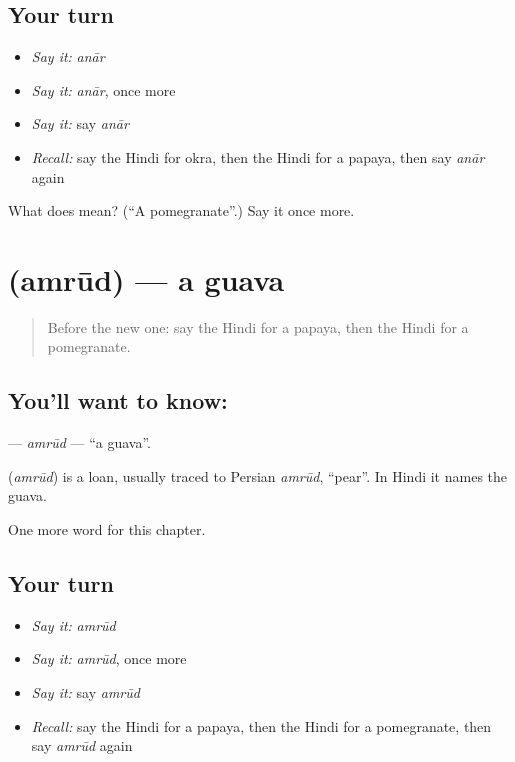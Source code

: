 \subsection*{Your turn}
\begin{itemize}
\raggedright
  \item \emph{Say it:} \emph{anār}
  \item \emph{Say it:} \emph{anār}, once more
  \item \emph{Say it:} say \emph{anār}
  \item \emph{Recall:} say the Hindi for okra, then the Hindi for a papaya, then say \emph{anār} again
\end{itemize}

\begin{tcolorbox}[breakable,colback=teal!4,colframe=teal!35!black,title={Before you move on}]
What does  mean? (\textquotedblleft{}A pomegranate\textquotedblright{}.) Say it once more.
\end{tcolorbox}
\section[\texorpdfstring{\hi{अमरूद} (amrūd)}{अमरूद (amrūd)}]{ (amrūd) — a guava}

\label{lesson:HI-C217-amrud}



\begin{quote}
Before the new one: say the Hindi for a papaya, then the Hindi for a pomegranate.
\end{quote}

\subsection*{You'll want to know: }
\textbf{} — \emph{amrūd} — \textquotedblleft{}a guava\textquotedblright{}.

\begin{cousinweb}
\textbf{} (\emph{amrūd}) is a loan, usually traced to Persian \emph{amrūd}, \textquotedblleft{}pear\textquotedblright{}. In Hindi it names the guava.
\end{cousinweb}

\begin{grammarlens}[title={What you've built}]
One more word for this chapter.
\end{grammarlens}

\subsection*{Your turn}
\begin{itemize}
\raggedright
  \item \emph{Say it:} \emph{amrūd}
  \item \emph{Say it:} \emph{amrūd}, once more
  \item \emph{Say it:} say \emph{amrūd}
  \item \emph{Recall:} say the Hindi for a papaya, then the Hindi for a pomegranate, then say \emph{amrūd} again
\end{itemize}

